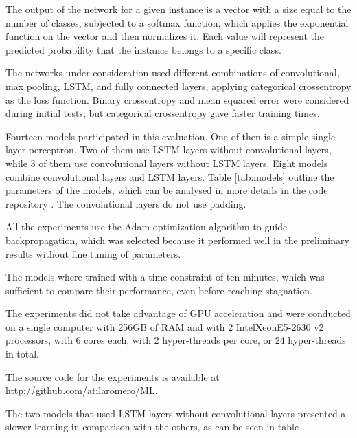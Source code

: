 The output of the network for a given instance is a vector with a size equal to the number of classes, subjected to a softmax function, which applies the exponential function on the vector and then normalizes it. Each value will represent the predicted probability that the instance belongs to a specific class.


The networks under consideration used different combinations of convolutional, max pooling, LSTM, and fully connected layers,
applying categorical crossentropy as the loss function. Binary crossentropy and mean squared error were considered during initial tests, but categorical crossentropy gave faster training times.

Fourteen models participated in this evaluation. One of then is a simple single layer perceptron. Two of them use LSTM layers without convolutional layers, while 3 of them use convolutional layers without LSTM layers. Eight models combine convolutional layers and LSTM layers. Table \ref{tab:models} outline the parameters of the models, which can be analysed in more details in the code repository . The convolutional layers do not use padding. 



All the experiments use the Adam \cite{kingma_adam:_2014}
optimization algorithm to guide backpropagation, which was selected because it performed well in the preliminary results without fine tuning of parameters.

The models where trained with a time constraint of ten minutes, which was sufficient to compare their performance, even before reaching stagnation.

The experiments did not take advantage of GPU acceleration and were  conducted on a single computer with 256GB of RAM and with 2 Intel\textregistered Xeon\textregistered E5-2630 v2 processors, with 6 cores each, with 2 hyper-threads per core, or 24 hyper-threads in total. 



The source code for the experiments is available at \url{http://github.com/atilaromero/ML}.

The two models that used LSTM layers without convolutional layers presented a slower learning in comparison with the others, as can be seen in table .

